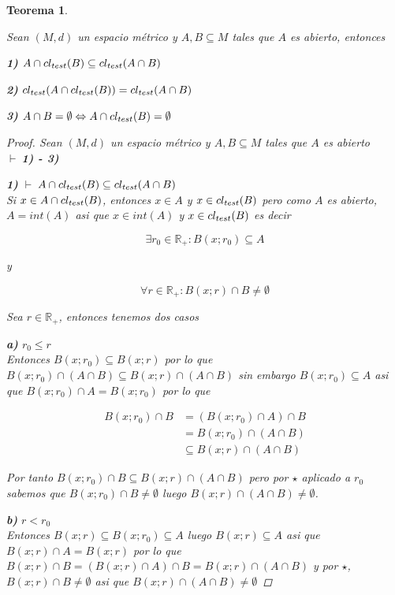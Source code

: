 \documentclass[oneside]{book} %
\theoremstyle{Teorema}
\newtheorem{Teorema}[Definicion]{Teorema}
\theoremstyle{Ejemplos}
\theoremstyle{[Obs]}
\def \test {test}
\newcommand{\cerradura}[2][\test]{\ifx \test #1 {\overline{#2}} \else {cl_{#1}(#2)} \fi} %
\renewcommand{\{}{\left\lbrace} %
\renewcommand{\}}{\right\rbrace} %
\newcommand{\n}{\cap} %
\renewcommand{\sc}{\subseteq} %
\newcommand{\R}{\mathbb{R}} %
\newcommand{\pd}{$\vdash\ $} %
\begin{document}
			\begin{Teorema}\label{Teorema: Abiertos en intersecciones de cerraduras}\setlength{\parindent}{0em}
			
				Sean $(M, d)$ un espacio métrico y $A, B \sc M$ tales que $A$ es abierto, entonces 
				
				\textbf{1)} $A \n \cerradura{B} \sc \cerradura{A \n B}$

				\textbf{2)} $\cerradura{A \n \cerradura{B}} = \cerradura{A \n B}$

				\textbf{3)} $A \n B = \emptyset \Leftrightarrow A \n \cerradura{B} = \emptyset$

				\begin{proof}
					
					Sean $(M, d)$ un espacio métrico y $A, B \sc M$ tales que $A$ es abierto \\ 
					\pd \textbf{1) - 3)}

					\textbf{1)} \pd $A \n \cerradura{B} \sc \cerradura{A \n B}$ \\ 
					Si $x \in A \n \cerradura{B}$, entonces $x \in A$ y $x \in \cerradura{B}$ pero como $A$ es abierto, $A = int(A)$ asi que $x \in int(A)$ y $x \in \cerradura{B}$ es decir 

					\[ \exists r_0 \in \R_{+} : B(x;r_0) \sc A \] 

					y

					\begin{equation}\tag{$\star$}
						\forall r \in \R_{+} : B(x;r) \n B \neq \emptyset
					\end{equation}

					Sea $r \in \R_{+}$, entonces tenemos dos casos 

					\textbf{a)} $r_0 \leq r$ \\ 
					Entonces $B(x;r_0) \sc B(x;r)$ por lo que $B(x;r_0) \n (A \n B) \sc B(x;r) \n (A \n B)$ sin embargo $B(x;r_0) \sc A$ asi que $B(x;r_0) \n A = B(x;r_0)$ por lo que 
					
					\begin{align*}
						B(x;r_0) \n B &= (B(x;r_0) \n A) \n B \\
						&= B(x;r_0) \n (A \n B) \\ 
						&\sc B(x;r) \n (A \n B)
					\end{align*}

					Por tanto $B(x;r_0) \n B \sc B(x;r) \n (A \n B)$ pero por $\star$ aplicado a $r_0$ sabemos que $B(x;r_0) \n B \neq \emptyset$ luego $B(x;r) \n (A \n B) \neq \emptyset$.

					\textbf{b)} $r < r_0$ \\ 
					Entonces $B(x;r) \sc B(x;r_0) \sc A$ luego $B(x;r) \sc A$ asi que $B(x;r) \n A = B(x;r)$ por lo que $B(x;r) \n B = (B(x;r) \n A) \n B = B(x;r) \n (A \n B)$ y por $\star$, $B(x;r) \n B \neq \emptyset$ asi que $B(x;r) \n (A \n B) \neq \emptyset$


\end{proof}
\end{Teorema}
\end{document}
